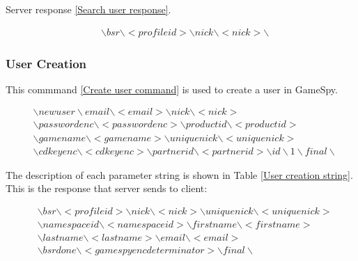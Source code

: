 \documentclass[oneside,titlepage,a4paper]{Definition/retrospy} %
\begin{document}
Server response \ref{Search user response}.

\begin{tcolorbox}
	\begin{equation}\label{Search user response}
	\begin{split}
&\backslash bsr \backslash < profileid > \backslash nick \backslash < nick > \backslash 
	\end{split}
	\end{equation}
\end{tcolorbox}

\subsubsection{User Creation}
This commmand \ref{Create user command} is used to create a user in GameSpy.
\begin{tcolorbox}
	\begin{equation}\label{Create user command}
	\begin{split}
	&\backslash newuser \backslash email \backslash < email > \backslash nick \backslash < nick > \\
	& \backslash passwordenc \backslash < passwordenc > 
	\backslash productid \backslash < productid > \\
	& \backslash gamename \backslash < gamename > \backslash uniquenick \backslash < uniquenick > \\
	& \backslash cdkeyenc \backslash < cdkeyenc > \backslash partnerid \backslash < partnerid > \backslash id \backslash 1 \backslash final \backslash
	\end{split}	
	\end{equation}
\end{tcolorbox}

The description of each parameter string is shown in Table \ref{User creation string}.
This is the response that server sends to client:
\begin{tcolorbox}
\begin{equation}
	\begin{split}
	&\backslash bsr \backslash <profileid> \backslash nick \backslash <nick>	\backslash uniquenick \backslash <uniquenick> \\
	&\backslash namespaceid \backslash <namespaceid>\backslash firstname \backslash <firstname> \\ 
	&\backslash lastname \backslash <lastname>\backslash email \backslash <email> \\
	&\backslash bsrdone \backslash <gamespy enc determinator> \backslash final \backslash
	\end{split}
\end{equation}
\end{tcolorbox}
\end{document}
